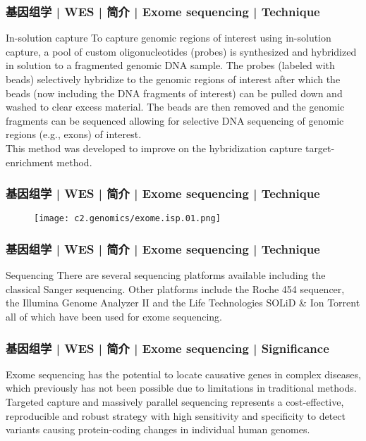 \begin{frame}
  \frametitle{基因组学 | WES | 简介 | Exome sequencing | Technique}
  \begin{block}{In-solution capture}
 To capture genomic regions of interest using in-solution capture, a pool of custom oligonucleotides (probes) is synthesized and hybridized in solution to a fragmented genomic DNA sample. The probes (labeled with beads) selectively hybridize to the genomic regions of interest after which the beads (now including the DNA fragments of interest) can be pulled down and washed to clear excess material. The beads are then removed and the genomic fragments can be sequenced allowing for selective DNA sequencing of genomic regions (e.g., exons) of interest.\\
 \vspace{1em}
 This method was developed to improve on the hybridization capture target-enrichment method.
  \end{block}
\end{frame}

\begin{frame}
  \frametitle{基因组学 | WES | 简介 | Exome sequencing | Technique}
  \begin{figure}
    \centering
    \texttt{[image: c2.genomics/exome.isp.01.png]}
  \end{figure}
\end{frame}

\begin{frame}
  \frametitle{基因组学 | WES | 简介 | Exome sequencing | Technique}
  \begin{block}{Sequencing}
 There are several sequencing platforms available including the classical Sanger sequencing. Other platforms include the Roche 454 sequencer, the Illumina Genome Analyzer II and the Life Technologies SOLiD \& Ion Torrent all of which have been used for exome sequencing.
  \end{block}
\end{frame}

\begin{frame}
  \frametitle{基因组学 | WES | 简介 | Exome sequencing | Significance}
  Exome sequencing has the potential to locate causative genes in complex diseases, which previously has not been possible due to limitations in traditional methods.\\
  \vspace{1em}
  Targeted capture and massively parallel sequencing represents a cost-effective, reproducible and robust strategy with high sensitivity and specificity to detect variants causing protein-coding changes in individual human genomes.
\end{frame}

